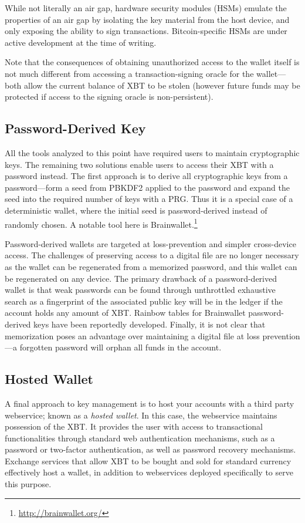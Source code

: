 While not literally an air gap, hardware security modules (HSMs) emulate the properties of an air gap by isolating the key material from the host device, and only exposing the ability to sign transactions. Bitcoin-specific HSMs are under active development at the time of writing.

Note that the consequences of obtaining unauthorized access to the wallet itself is not much different from accessing a transaction-signing oracle for the wallet---both allow the current balance of XBT to be stolen (however future funds may be protected if access to the signing oracle is non-persistent). 


\subsection{Password-Derived Key} 

All the tools analyzed to this point have required users to maintain cryptographic keys. The remaining two solutions enable users to access their XBT with a password instead. The first approach is to derive all cryptographic keys from a password---\eg form a seed from PBKDF2 applied to the password and expand the seed into the required number of keys with a PRG. Thus it is a special case of a deterministic wallet, where the initial seed is password-derived instead of randomly chosen. A notable tool here is Brainwallet.\footnote{\url{http://brainwallet.org/}}

Password-derived wallets are targeted at loss-prevention and simpler cross-device access. The challenges of preserving access to a digital file are no longer necessary as the wallet can be regenerated from a memorized password, and this wallet can be regenerated on any device. The primary drawback of a password-derived wallet is that weak passwords can be found through unthrottled exhaustive search as a fingerprint of the associated public key will be in the ledger if the account holds any amount of XBT. Rainbow tables for Brainwallet password-derived keys have been reportedly developed. Finally, it is not clear that memorization poses an advantage over maintaining a digital file at loss prevention---a forgotten password will orphan all funds in the account.


\subsection{Hosted Wallet} 

A final approach to key management is to host your accounts with a third party webservice; known as a \textit{hosted wallet}. In this case, the webservice maintains possession of the XBT. It provides the user with access to transactional functionalities through standard web authentication mechanisms, such as a password or two-factor authentication, as well as password recovery mechanisms. Exchange services that allow XBT to be bought and sold for standard currency effectively host a wallet, in addition to webservices deployed specifically to serve this purpose. 

